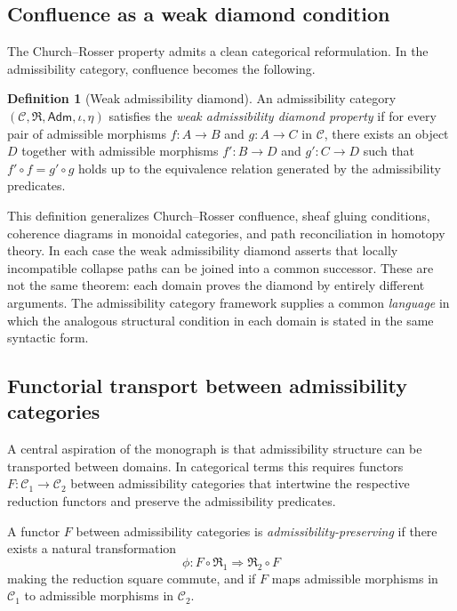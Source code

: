 \documentclass[12pt, a4paper]{article}
\theoremstyle{plain}
\theoremstyle{definition}
\newtheorem{definition}[theorem]{Definition}
\theoremstyle{remark}
\begin{document}
\subsection{Confluence as a weak diamond condition}

The Church--Rosser property admits a clean categorical reformulation. In the
admissibility category, confluence becomes the following.

\begin{definition}[Weak admissibility diamond]
  An admissibility category $(\mathcal{C}, \mathfrak{R}, \mathsf{Adm}, \iota, \eta)$
  satisfies the \emph{weak admissibility diamond property} if for every pair of
  admissible morphisms $f : A \to B$ and $g : A \to C$ in $\mathcal{C}$, there
  exists an object $D$ together with admissible morphisms $f' : B \to D$ and
  $g' : C \to D$ such that $f' \circ f = g' \circ g$ holds up to the equivalence
  relation generated by the admissibility predicates.
\end{definition}

This definition generalizes Church--Rosser confluence, sheaf gluing conditions,
coherence diagrams in monoidal categories, and path reconciliation in homotopy theory.
In each case the weak admissibility diamond asserts that locally incompatible collapse
paths can be joined into a common successor. These are not the same theorem: each
domain proves the diamond by entirely different arguments. The admissibility category
framework supplies a common \emph{language} in which the analogous structural
condition in each domain is stated in the same syntactic form.

\subsection{Functorial transport between admissibility categories}

A central aspiration of the monograph is that admissibility structure can be
transported between domains. In categorical terms this requires functors
$F : \mathcal{C}_1 \to \mathcal{C}_2$ between admissibility categories that intertwine
the respective reduction functors and preserve the admissibility predicates.

A functor $F$ between admissibility categories is \emph{admissibility-preserving} if
there exists a natural transformation
\[
  \phi : F \circ \mathfrak{R}_1 \Rightarrow \mathfrak{R}_2 \circ F
\]
making the reduction square commute, and if $F$ maps admissible morphisms in
$\mathcal{C}_1$ to admissible morphisms in $\mathcal{C}_2$.
\end{document}
